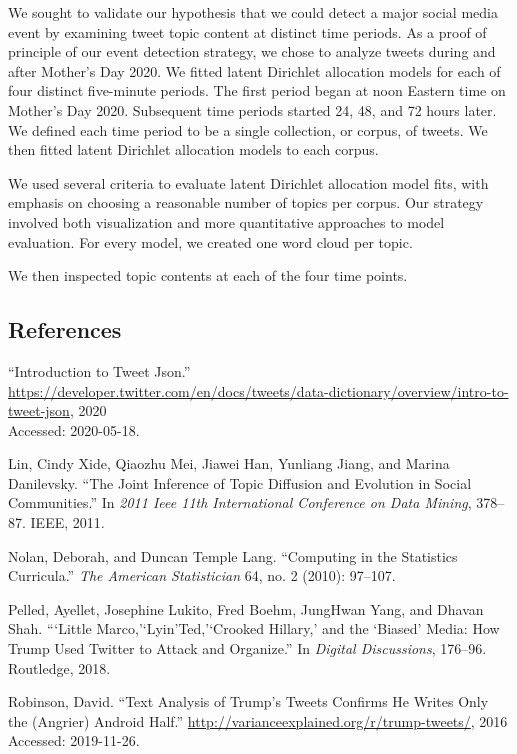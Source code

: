 \documentclass[
]{article}
\begin{document}
We sought to validate our hypothesis that we could detect a major social
media event by examining tweet topic content at distinct time periods.
As a proof of principle of our event detection strategy, we chose to
analyze tweets during and after Mother's Day 2020. We fitted latent
Dirichlet allocation models for each of four distinct five-minute
periods. The first period began at noon Eastern time on Mother's Day
2020. Subsequent time periods started 24, 48, and 72 hours later. We
defined each time period to be a single collection, or corpus, of
tweets. We then fitted latent Dirichlet allocation models to each
corpus.

We used several criteria to evaluate latent Dirichlet allocation model
fits, with emphasis on choosing a reasonable number of topics per
corpus. Our strategy involved both visualization and more quantitative
approaches to model evaluation. For every model, we created one word
cloud per topic.

We then inspected topic contents at each of the four time points.

\hypertarget{references}{%
\subsection{References}\label{references}}

\hypertarget{refs}{}
\leavevmode\hypertarget{ref-tweet_json}{}%
``Introduction to Tweet Json.''
\url{https://developer.twitter.com/en/docs/tweets/data-dictionary/overview/intro-to-tweet-json},
2020\\
Accessed: 2020-05-18.

\leavevmode\hypertarget{ref-lin2011joint}{}%
Lin, Cindy Xide, Qiaozhu Mei, Jiawei Han, Yunliang Jiang, and Marina
Danilevsky. ``The Joint Inference of Topic Diffusion and Evolution in
Social Communities.'' In \emph{2011 Ieee 11th International Conference
on Data Mining}, 378--87. IEEE, 2011.

\leavevmode\hypertarget{ref-nolan2010computing}{}%
Nolan, Deborah, and Duncan Temple Lang. ``Computing in the Statistics
Curricula.'' \emph{The American Statistician} 64, no. 2 (2010): 97--107.

\leavevmode\hypertarget{ref-pelled2018little}{}%
Pelled, Ayellet, Josephine Lukito, Fred Boehm, JungHwan Yang, and Dhavan
Shah. ```Little Marco,'`Lyin'Ted,'`Crooked Hillary,' and the `Biased'
Media: How Trump Used Twitter to Attack and Organize.'' In \emph{Digital
Discussions}, 176--96. Routledge, 2018.

\leavevmode\hypertarget{ref-drob}{}%
Robinson, David. ``Text Analysis of Trump's Tweets Confirms He Writes
Only the (Angrier) Android Half.''
\url{http://varianceexplained.org/r/trump-tweets/}, 2016\\
Accessed: 2019-11-26.
\end{document}
